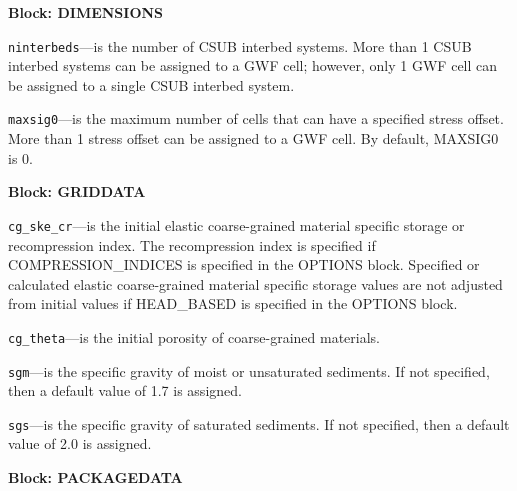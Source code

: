 \item \textbf{Block: DIMENSIONS}

\begin{description}
\item \texttt{ninterbeds}---is the number of CSUB interbed systems.  More than 1 CSUB interbed systems can be assigned to a GWF cell; however, only 1 GWF cell can be assigned to a single CSUB interbed system.

\item \texttt{maxsig0}---is the maximum number of cells that can have a specified stress offset.  More than 1 stress offset can be assigned to a GWF cell. By default, MAXSIG0 is 0.

\end{description}
\item \textbf{Block: GRIDDATA}

\begin{description}
\item \texttt{cg\_ske\_cr}---is the initial elastic coarse-grained material specific storage or recompression index. The recompression index is specified if COMPRESSION\_INDICES is specified in the OPTIONS block.  Specified or calculated elastic coarse-grained material specific storage values are not adjusted from initial values if HEAD\_BASED is specified in the OPTIONS block.

\item \texttt{cg\_theta}---is the initial porosity of coarse-grained materials.

\item \texttt{sgm}---is the specific gravity of moist or unsaturated sediments.  If not specified, then a default value of 1.7 is assigned.

\item \texttt{sgs}---is the specific gravity of saturated sediments. If not specified, then a default value of 2.0 is assigned.

\end{description}
\item \textbf{Block: PACKAGEDATA}

